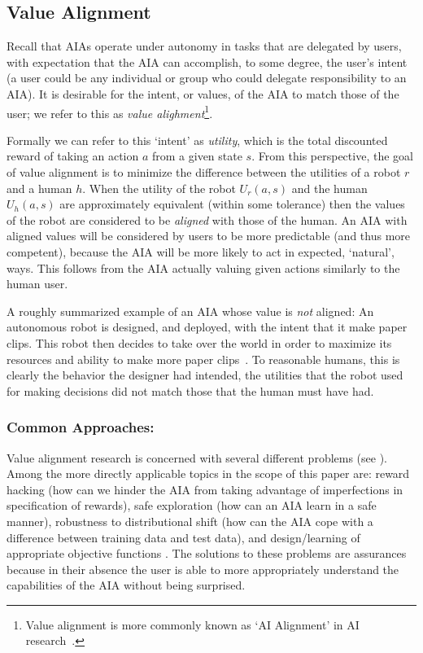 \subsection{Value Alignment} \label{sec:value_alignment}
Recall that AIAs operate under autonomy in tasks that are delegated by users, with expectation that the AIA can accomplish, to some degree, the user's intent (a user could be any individual or group who could delegate responsibility to an AIA). It is desirable for the intent, or values, of the AIA to match those of the user; we refer to this as \emph{value alighment}\footnote{Value alignment is more commonly known as `AI Alignment' in AI research~\cite{Yudkowsky2001-hb,Bensinger2014-ul}.}.

Formally we can refer to this `intent' as \emph{utility}, which is the total discounted reward of taking an action $a$ from a given state $s$. From this perspective, the goal of value alignment is to minimize the difference between the utilities of a robot $r$ and a human $h$. When the utility of the robot $U_r(a,s)$ and the human $U_h(a,s)$ are approximately equivalent (within some tolerance) then the values of the robot are considered to be \emph{aligned} with those of the human. An AIA with aligned values will be considered by users to be more predictable (and thus more competent), because the AIA will be more likely to act in expected, `natural', ways. This follows from the AIA actually valuing given actions similarly to the human user.

A roughly summarized example of an AIA whose value is \emph{not} aligned: An autonomous robot is designed, and deployed, with the intent that it make paper clips. This robot then decides to take over the world in order to maximize its resources and ability to make more paper clips~\cite{Bostrom2014-fz}. To reasonable humans, this is clearly  the behavior the designer had intended, the utilities that the robot used for making decisions did not match those that the human must have had.

\subsubsection{Common Approaches:}
Value alignment research is concerned with several different problems (see \cite{Gordon_Worley2018-xy,Amodei2016-xi}). Among the more directly applicable topics in the scope of this paper are: reward hacking (how can we hinder the AIA from taking advantage of imperfections in specification of rewards), safe exploration (how can an AIA learn in a safe manner), robustness to distributional shift (how can the AIA cope with a difference between training data and test data), and design/learning of appropriate objective functions \cite{Hadfield-Menell2016-ws,Da_Veiga2012-gh,Garcia2015-rs}. The solutions to these problems are assurances because in their absence the user is able to more appropriately understand the capabilities of the AIA without being surprised.

